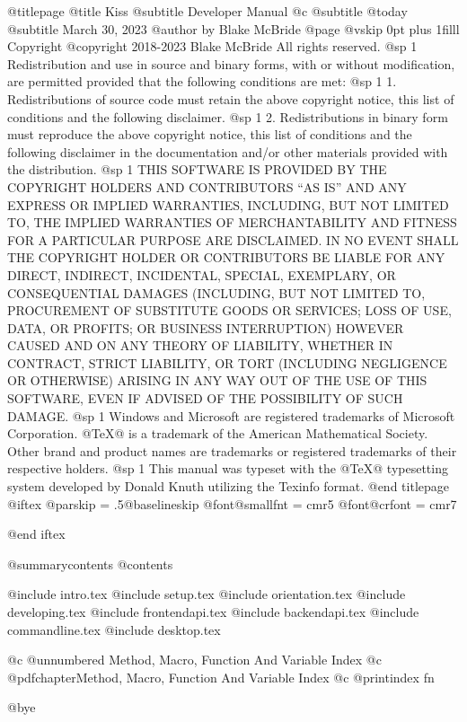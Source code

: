 @titlepage
@title Kiss
@subtitle Developer Manual
@c @subtitle @today{}
@subtitle March 30, 2023
@author by Blake McBride
@page
@vskip 0pt plus 1filll
Copyright  @copyright{} 2018-2023 Blake McBride
All rights reserved.
@sp 1
Redistribution and use in source and binary forms, with or without
modification, are permitted provided that the following conditions are
met:
@sp 1
1. Redistributions of source code must retain the above copyright
notice, this list of conditions and the following disclaimer.
@sp 1
2. Redistributions in binary form must reproduce the above copyright
notice, this list of conditions and the following disclaimer in the
documentation and/or other materials provided with the distribution.
@sp 1
THIS SOFTWARE IS PROVIDED BY THE COPYRIGHT HOLDERS AND CONTRIBUTORS
``AS IS'' AND ANY EXPRESS OR IMPLIED WARRANTIES, INCLUDING, BUT NOT
LIMITED TO, THE IMPLIED WARRANTIES OF MERCHANTABILITY AND FITNESS FOR
A PARTICULAR PURPOSE ARE DISCLAIMED. IN NO EVENT SHALL THE COPYRIGHT
HOLDER OR CONTRIBUTORS BE LIABLE FOR ANY DIRECT, INDIRECT, INCIDENTAL,
SPECIAL, EXEMPLARY, OR CONSEQUENTIAL DAMAGES (INCLUDING, BUT NOT
LIMITED TO, PROCUREMENT OF SUBSTITUTE GOODS OR SERVICES; LOSS OF USE,
DATA, OR PROFITS; OR BUSINESS INTERRUPTION) HOWEVER CAUSED AND ON ANY
THEORY OF LIABILITY, WHETHER IN CONTRACT, STRICT LIABILITY, OR TORT
(INCLUDING NEGLIGENCE OR OTHERWISE) ARISING IN ANY WAY OUT OF THE USE
OF THIS SOFTWARE, EVEN IF ADVISED OF THE POSSIBILITY OF SUCH DAMAGE.
@sp 1
Windows and Microsoft are registered trademarks of
Microsoft Corporation.  @TeX{}@ is a trademark of the American
Mathematical Society. Other brand and product names are trademarks or
registered trademarks of their respective holders.
@sp 1
This manual was typeset with the @TeX{}@ typesetting system developed by
Donald Knuth utilizing the Texinfo format.
@end titlepage
@iftex
@parskip = .5@baselineskip
@font@smallfnt = cmr5
@font@crfont = cmr7

@end iftex

@summarycontents
@contents

@include intro.tex
@include setup.tex
@include orientation.tex
@include developing.tex
@include frontendapi.tex
@include backendapi.tex
@include commandline.tex
@include desktop.tex

@c @unnumbered Method, Macro, Function And Variable Index
@c @pdfchapter{Method, Macro, Function And Variable Index}
@c @printindex fn

@bye

